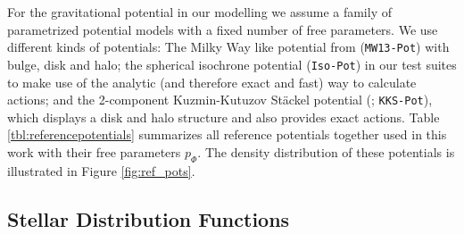 For the gravitational potential in our modelling we assume a family of parametrized potential models with a fixed number of free parameters. We use different kinds of potentials: The Milky Way like potential from \citet{bov13} (\texttt{MW13-Pot}) with bulge, disk and halo; the spherical isochrone potential (\texttt{Iso-Pot}) in our test suites to make use of the analytic (and therefore exact and fast) way  to calculate actions; and the 2-component Kuzmin-Kutuzov St\"{a}ckel potential (\citealt{bat94}; \texttt{KKS-Pot}), which displays a disk and halo structure and also provides exact actions. Table \ref{tbl:referencepotentials} summarizes all reference potentials together used in this work with their free parameters $p_\Phi$. The density distribution of these potentials is illustrated in Figure \ref{fig:ref_pots}.\\




\subsection{Stellar Distribution Functions} \label{sec:qDF}

